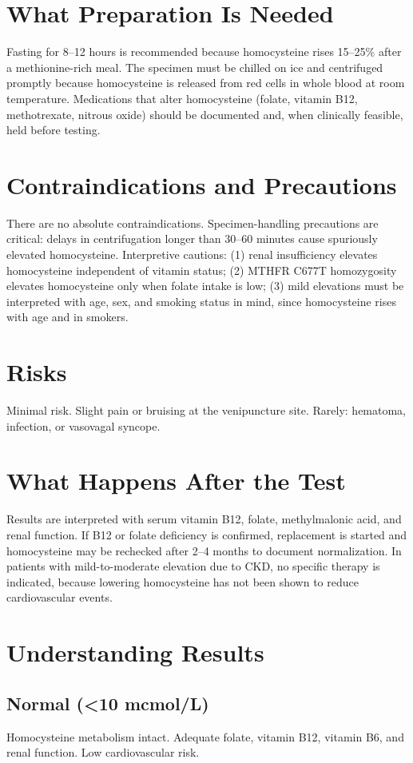 \section*{What Preparation Is Needed}
Fasting for 8--12 hours is recommended because homocysteine rises 15--25\% after a methionine-rich meal. The specimen must be chilled on ice and centrifuged promptly because homocysteine is released from red cells in whole blood at room temperature. Medications that alter homocysteine (folate, vitamin B12, methotrexate, nitrous oxide) should be documented and, when clinically feasible, held before testing.
\section*{Contraindications and Precautions}
There are no absolute contraindications. Specimen-handling precautions are critical: delays in centrifugation longer than 30--60 minutes cause spuriously elevated homocysteine. Interpretive cautions: (1) renal insufficiency elevates homocysteine independent of vitamin status; (2) MTHFR C677T homozygosity elevates homocysteine only when folate intake is low; (3) mild elevations must be interpreted with age, sex, and smoking status in mind, since homocysteine rises with age and in smokers.
\section*{Risks}
Minimal risk. Slight pain or bruising at the venipuncture site. Rarely: hematoma, infection, or vasovagal syncope.
\section*{What Happens After the Test}
Results are interpreted with serum vitamin B12, folate, methylmalonic acid, and renal function. If B12 or folate deficiency is confirmed, replacement is started and homocysteine may be rechecked after 2--4 months to document normalization. In patients with mild-to-moderate elevation due to CKD, no specific therapy is indicated, because lowering homocysteine has not been shown to reduce cardiovascular events.
\section*{Understanding Results}
\subsection*{Normal (<10 mcmol/L)}
Homocysteine metabolism intact. Adequate folate, vitamin B12, vitamin B6, and renal function. Low cardiovascular risk.
